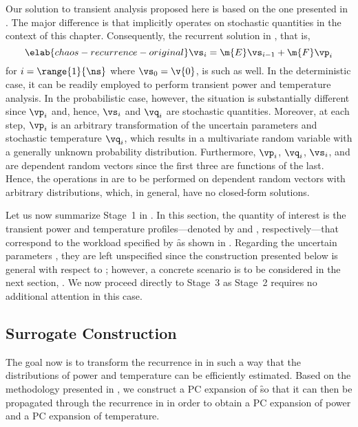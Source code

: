 Our solution to transient analysis proposed here is based on the one presented
in . The major difference is that
 implicitly operates on stochastic quantities in the
context of this chapter. Consequently, the recurrent solution in
, that is,
\begin{equation} \elab{chaos-recurrence-original}
  \vs_i = \m{E} \vs_{i - 1} + \m{F} \vp_i
\end{equation}
for $i = \range{1}{\ns}$ where $\vs_0 = \v{0}$, is such as well. In the
deterministic case, it can be readily employed to perform transient power and
temperature analysis. In the probabilistic case, however, the situation is
substantially different since $\vp_i$ and, hence, $\vs_i$ and $\vq_i$ are
stochastic quantities. Moreover, at each step, $\vp_i$ is an arbitrary
transformation of the uncertain parameters \vu and stochastic temperature
$\vq_i$, which results in a multivariate random variable with a generally
unknown probability distribution. Furthermore, $\vp_i$, $\vq_i$, $\vs_i$, and
\vu are dependent random vectors since the first three are functions of the
last. Hence, the operations in  are to be
performed on dependent random vectors with arbitrary distributions, which, in
general, have no closed-form solutions.

Let us now summarize Stage~1 in . In this section, the
quantity of interest \g is the transient power and temperature
profiles---denoted by \mp and \mq, respectively---that correspond to the
workload specified by \f as shown in . Regarding the
uncertain parameters \vu, they are left unspecified since the construction
presented below is general with respect to \vu; however, a concrete scenario is
to be considered in the next section, . We now
proceed directly to Stage~3 as Stage~2 requires no additional attention in this
case.

\subsection{Surrogate Construction}

The goal now is to transform the recurrence in 
in such a way that the distributions of power and temperature can be efficiently
estimated. Based on the methodology presented in
, we construct a \ac{PC} expansion of \f so
that it can then be propagated through the recurrence in
 in order to obtain a \ac{PC} expansion of power
and a \ac{PC} expansion of temperature.

